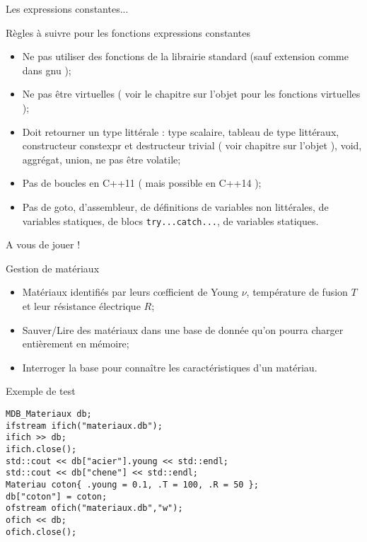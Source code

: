 \documentclass[handout,10pt]{beamer}
\newcommand{\includepartcode}[4][cpp]{

}
\begin{document}
\begin{frame}[fragile]{Les expressions constantes...}
\tiny
\begin{block}{Règles à suivre pour les fonctions expressions constantes}
\begin{itemize}
\item Ne pas utiliser des fonctions de la librairie standard  (sauf extension comme dans gnu );
\item Ne pas être virtuelles ( voir le chapitre sur l'objet pour les fonctions virtuelles );
\item Doit retourner un type littérale : type scalaire, tableau de type littéraux, constructeur constexpr et destructeur trivial ( voir chapitre sur l'objet ), void, aggrégat, union, ne pas être volatile;
\item Pas de boucles en C++11 ( mais possible en C++14 );
\item Pas de goto, d'assembleur, de définitions de variables non littérales, de variables statiques, de blocs \lstinline$try...catch...$, de variables statiques.
\end{itemize}
\end{block}
\includepartcode{constexpr.cpp}{13}{28}
\includepartcode{constexpr.cpp}{35}{38}
\end{frame}

\begin{frame}[fragile]{A vous de jouer !}
\tiny
\begin{block}{Gestion de matériaux}
\begin{itemize}
\item Matériaux identifiés par leurs c{\oe}fficient de Young $\nu$, température de fusion $T$ et leur résistance électrique $R$;
\item Sauver/Lire des matériaux dans une base de donnée qu'on pourra charger entièrement en mémoire;
\item Interroger la base pour connaître les caractéristiques d'un matériau.
\end{itemize}
\end{block}

\begin{block}{Exemple de test}
\begin{lstlisting}
MDB_Materiaux db;
ifstream ifich("materiaux.db");
ifich >> db;
ifich.close();
std::cout << db["acier"].young << std::endl;
std::cout << db["chene"] << std::endl;
Materiau coton{ .young = 0.1, .T = 100, .R = 50 };
db["coton"] = coton;
ofstream ofich("materiaux.db","w");
ofich << db;
ofich.close();
\end{lstlisting}
\end{block}
\end{frame}
\end{document}
